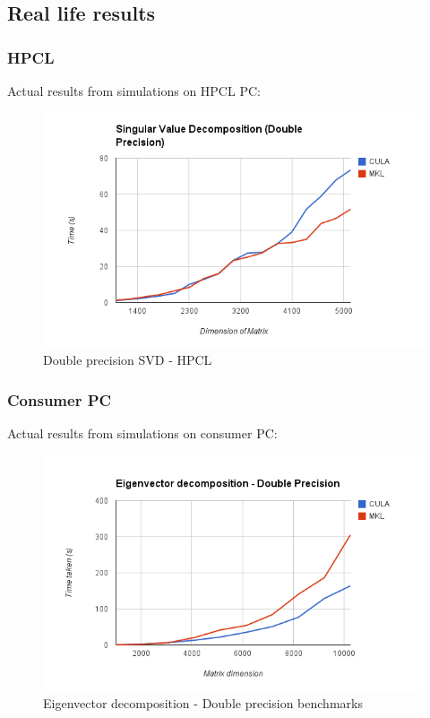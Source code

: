 \documentclass{beamer}
\begin{document}
\subsection{Real life results}
\begin{frame}
\frametitle{HPCL}
Actual results from simulations on HPCL PC:
\begin{figure}[H]
 \includegraphics[width=\textwidth]{hpcldgesvd.png}
 \caption{Double precision SVD - HPCL}
 \label{hpcldgesvd}
\end{figure}
\end{frame}

\begin{frame}
\frametitle{Consumer PC}
Actual results from simulations on consumer PC:

\begin{figure}[H]
 \includegraphics[width=\textwidth]{dsyev_bench.png}
 \caption{Eigenvector decomposition - Double precision benchmarks }
 \label{eigenbench}
\end{figure}

\end{frame}
\end{document}

